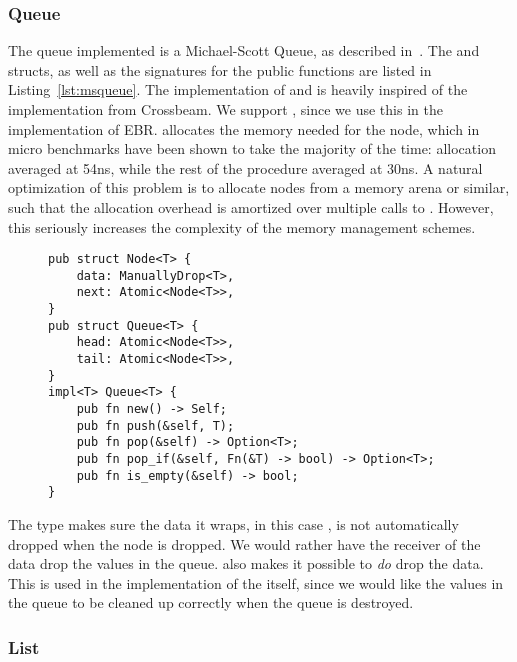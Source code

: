 \documentclass[b5paper]{report}
\begin{document}
\subsubsection{Queue}

The queue implemented is a Michael-Scott Queue, as described
in~\cite{michael1996simple}. 
The  and  structs, as well as the signatures for the
public functions are listed in Listing~\ref{lst:msqueue}. The implementation of
 and  is heavily inspired of the implementation from
Crossbeam\cite{crossbeam-msqueue}. We support , since we use this
in the implementation of EBR.  allocates the memory needed for the
node, which in micro benchmarks have been shown to take the majority of the time:
allocation averaged at 54ns, while the rest of the procedure averaged at 30ns.
A natural optimization of this problem is to allocate nodes from a memory arena
or similar, such that the allocation overhead is amortized over multiple calls
to . However, this seriously increases the complexity of the memory
management schemes.

\begin{figure}[ht]
\begin{lstlisting}[caption=Structs for the Michael-Scott
Queue,label=lst:msqueue,numbers=none]
pub struct Node<T> {
    data: ManuallyDrop<T>,
    next: Atomic<Node<T>>,
}
pub struct Queue<T> {
    head: Atomic<Node<T>>,
    tail: Atomic<Node<T>>,
}
impl<T> Queue<T> {
    pub fn new() -> Self;
    pub fn push(&self, T);
    pub fn pop(&self) -> Option<T>;
    pub fn pop_if(&self, Fn(&T) -> bool) -> Option<T>;
    pub fn is_empty(&self) -> bool;
}
\end{lstlisting}
\end{figure}

The  type makes sure the data it wraps, in this case
, is not automatically dropped when the node is dropped. We would rather
have the receiver of the data drop the values in the queue. 
also makes it possible to \emph{do} drop the data. This is used in the
 implementation of the  itself, since we would like the
values in the queue to be cleaned up correctly when the queue is destroyed.

\subsubsection{List\label{sec:impl-list}}
\end{document}
